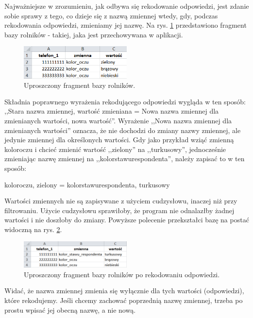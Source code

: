 \documentclass[12pt, twoside, hidelinks]{report}
\begin{document}
Najważniejsze w zrozumieniu, jak odbywa się rekodowanie odpowiedzi, jest zdanie sobie sprawy z tego, co dzieje się z nazwą zmiennej wtedy, gdy, podczas rekodowania odpowiedzi, zmieniamy jej nazwę. Na rys. \ref{rekodowanie_fragment_bazy_rolnikow} przedstawiono fragment bazy rolników - takiej, jaka jest przechowywana w aplikacji. \par
\begin{figure}[h!]
\includegraphics[width = 0.5\textwidth]{3.7.}
\centering
\caption{Uproszczony fragment bazy rolników.}
\label{rekodowanie_fragment_bazy_rolnikow}
\end{figure}
Składnia poprawnego wyrażenia rekodującego odpowiedzi wygląda w ten sposób: ,,Stara nazwa zmiennej, wartość zmieniana = Nowa nazwa zmiennej dla zmienianych wartości, nowa wartość''. Wyrażenie ,,Nowa nazwa zmiennej dla zmienianych wartości'' oznacza, że nie dochodzi do zmiany nazwy zmiennej, ale jedynie zmiennej dla określonych wartości. Gdy jako przykład wziąć zmienną kolor\textunderscore oczu i chcieć zmienić wartość ,,zielony'' na ,,turkusowy'', jednocześnie zmieniając nazwę zmiennej na ,,kolor\textunderscore stawu\textunderscore respondenta'', należy zapisać to w ten sposób: \par
\begin{center}
kolor\textunderscore oczu, zielony = kolor\textunderscore stawu\textunderscore respondenta, turkusowy
\end{center}
Wartości zmiennych nie są zapisywane z użyciem cudzysłowu, inaczej niż przy filtrowaniu. Użycie cudzysłowu sprawiłoby, że program nie odnalazłby żadnej wartości i nie doszłoby do zmiany. Powyższe polecenie przekształci bazę na postać widoczną na rys. \ref{po_rekodowaniu_fragment_bazy_rolnikow}.
\begin{figure}[h!]
\includegraphics[width = 0.5\textwidth]{3.8.}
\centering
\caption{Uproszczony fragment bazy rolników po rekodowaniu odpowiedzi.}
\label{po_rekodowaniu_fragment_bazy_rolnikow}
\end{figure}
Widać, że nazwa zmiennej zmienia się wyłącznie dla tych wartości (odpowiedzi), które rekodujemy. Jeśli chcemy zachować poprzednią nazwę zmiennej, trzeba po prostu wpisać jej obecną nazwę, a nie nową. \par
\end{document}
